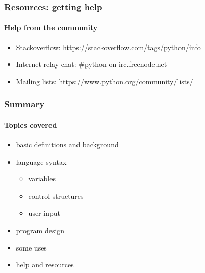 \documentclass{beamer}
\begin{document}
    \begin{frame}
	    \frametitle{Resources: getting help}
	    \framesubtitle{Help from the community}
	    \begin{itemize}
		    \item Stackoverflow: \url{https://stackoverflow.com/tags/python/info}
		    \item Internet relay chat: \#python on irc.freenode.net
		    \item Mailing lists: \url{https://www.python.org/community/lists/}
	    \end{itemize}
    \end{frame}
   \begin{frame}
	    \frametitle{Summary}
	    \framesubtitle{Topics covered}
	    \begin{itemize}
		    \item basic definitions and background
		    \item language syntax
			    \begin{itemize}
				    \item variables
				    \item control structures
				    \item user input
			    \end{itemize}
		    \item program design
		    \item some uses
		    \item help and resources
	    \end{itemize}
    \end{frame}
\end{document}
